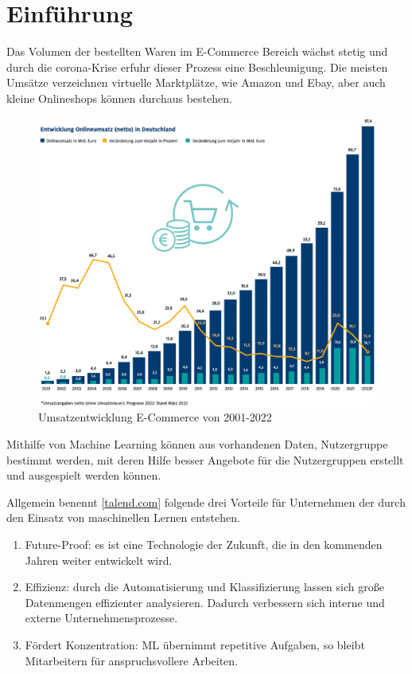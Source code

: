 \chapter{Einführung}
Das Volumen der bestellten Waren im E-Commerce Bereich wächst stetig und durch die \Gls{corona}-Krise erfuhr dieser Prozess eine Beschleunigung. Die meisten Umsätze verzeichnen virtuelle Marktplätze, wie Amazon und Ebay, aber auch kleine Onlineshops können durchaus bestehen.

\begin{figure}[!ht]
	\centering
	\includegraphics[width=\linewidth]{images/chapter1/umsatzprognose_2022.eps}
	\caption{Umsatzentwicklung E-Commerce von 2001-2022 \cite{ecommerce_statistics:versteegen2022}}
	\label{img:stat_prognose_2022}
\end{figure}

Mithilfe von Machine Learning können aus vorhandenen Daten, Nutzergruppe bestimmt werden, mit deren Hilfe besser Angebote für die Nutzergruppen erstellt und ausgespielt werden können.\vspace{0.2cm}

Allgemein benennt [\href{https://www.talend.com/de/resources/maschinelles-lernen}{talend.com}] folgende drei Vorteile für Unternehmen der durch den Einsatz von maschinellen Lernen entstehen.
\begin{enumerate}
	\item Future-Proof: es ist eine Technologie der Zukunft, die in den kommenden Jahren weiter entwickelt wird.
	\item Effizienz: durch die Automatisierung und Klassifizierung lassen sich große Datenmengen effizienter analysieren. Dadurch verbessern sich interne und externe Unternehmensprozesse.
	\item Fördert Konzentration: ML übernimmt repetitive Aufgaben, so bleibt Mitarbeitern für anspruchsvollere Arbeiten.
\end{enumerate}


